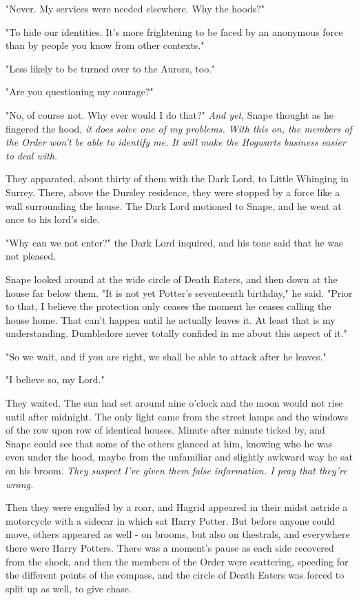 "Never. My services were needed elsewhere. Why the hoods?"

"To hide our identities. It's more frightening to be faced by an anonymous force than by people you know from other contexts."

"Less likely to be turned over to the Aurors, too."

"Are you questioning my courage?"

"No, of course not. Why ever would I do that?" \emph{And yet}, Snape thought as he fingered the hood, \emph{it does solve one of my problems. With this on, the members of the Order won't be able to identify me. It will make the Hogwarts business easier to deal with.}

They apparated, about thirty of them with the Dark Lord, to Little Whinging in Surrey. There, above the Dursley residence, they were stopped by a force like a wall surrounding the house. The Dark Lord motioned to Snape, and he went at once to his lord's side.

"Why can we not enter?" the Dark Lord inquired, and his tone said that he was not pleased.

Snape looked around at the wide circle of Death Eaters, and then down at the house far below them. "It is not yet Potter's seventeenth birthday," he said. "Prior to that, I believe the protection only ceases the moment he ceases calling the house home. That can't happen until he actually leaves it. At least that is my understanding. Dumbledore never totally confided in me about this aspect of it."

"So we wait, and if you are right, we shall be able to attack after he leaves."

"I believe so, my Lord."

They waited. The sun had set around nine o'clock and the moon would not rise until after midnight. The only light came from the street lamps and the windows of the row upon row of identical houses. Minute after minute ticked by, and Snape could see that some of the others glanced at him, knowing who he was even under the hood, maybe from the unfamiliar and slightly awkward way he sat on his broom. \emph{They suspect I've given them false information. I pray that they're wrong.}

Then they were engulfed by a roar, and Hagrid appeared in their midst astride a motorcycle with a sidecar in which sat Harry Potter. But before anyone could move, others appeared as well - on brooms, but also on thestrals, and everywhere there were Harry Potters. There was a moment's pause as each side recovered from the shock, and then the members of the Order were scattering, speeding for the different points of the compass, and the circle of Death Eaters was forced to split up as well, to give chase.

